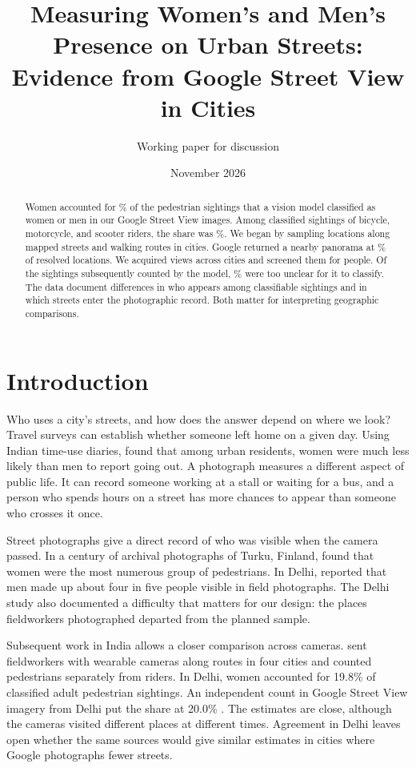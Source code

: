 \documentclass[11pt]{article}
\title{Measuring Women's and Men's Presence on Urban Streets:\\
  Evidence from Google Street View in \Sites{} Cities}
\author{Working paper for discussion}
\date{November 2026}
\begin{document}
\maketitle
\begin{abstract}
Women accounted for \MWPedPct\% of the \MWClassPed{} pedestrian sightings that a vision model classified as women or men in our Google Street View images. Among \MWClassRider{} classified sightings of bicycle, motorcycle, and scooter riders, the share was \MWRiderPct\%. We began by sampling \Points{} locations along mapped streets and walking routes in \Sites{} cities. Google returned a nearby panorama at \MatchPct\% of resolved locations. We acquired \MWImages{} views across \MWImageSites{} cities and screened them for people. Of the \MWSightings{} sightings subsequently counted by the model, \MWUnclearPct\% were too unclear for it to classify. The data document differences in who appears among classifiable sightings and in which streets enter the photographic record. Both matter for interpreting geographic comparisons.
\end{abstract}

\section{Introduction}
Who uses a city's streets, and how does the answer depend on where we look? Travel surveys can establish whether someone left home on a given day. Using Indian time-use diaries, \citet{goel2022mobility} found that among urban residents, women were much less likely than men to report going out. A photograph measures a different aspect of public life. It can record someone working at a stall or waiting for a bus, and a person who spends hours on a street has more chances to appear than someone who crosses it once.

Street photographs give a direct record of who was visible when the camera passed. In a century of archival photographs of Turku, Finland, \citet{turku2021walking} found that women were the most numerous group of pedestrians. In Delhi, \citet{sood2017womencount} reported that men made up about four in five people visible in field photographs. The Delhi study also documented a difficulty that matters for our design: the places fieldworkers photographed departed from the planned sample.

Subsequent work in India allows a closer comparison across cameras. \citet{karekurve2026streetscope} sent fieldworkers with wearable cameras along routes in four cities and counted pedestrians separately from riders. In Delhi, women accounted for 19.8\% of classified adult pedestrian sightings. An independent count in Google Street View imagery from Delhi put the share at 20.0\% \citep{sood2026streetsight}. The estimates are close, although the cameras visited different places at different times. Agreement in Delhi leaves open whether the same sources would give similar estimates in cities where Google photographs fewer streets.
\end{document}
